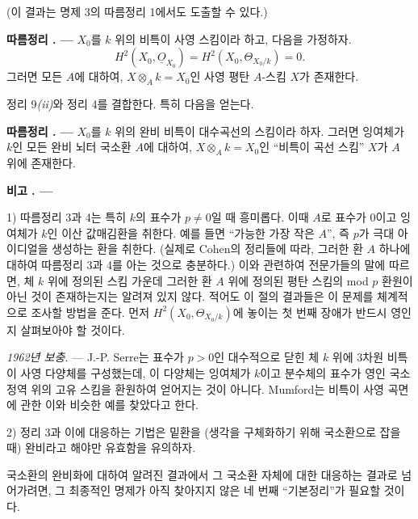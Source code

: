 \documentclass[11pt,twoside,openany]{book}
\numberwithin{equation}{section}
\newcommand{\Osh}{\underline{O}}
\theoremstyle{plain}
\theoremstyle{definition}
\theoremstyle{remark}
\newcommand{\result}[2]{%
  \par\medskip\noindent\textbf{#1%
  \if\relax\detokenize{#2}\relax\else\space#2\fi. ---}\enspace
}
\begin{document}
(이 결과는 명제 3의 따름정리 1에서도 도출할 수 있다.)

\result{따름정리}{3} $X_0$를 $k$ 위의 비특이 사영 스킴이라 하고,
다음을 가정하자.
\[
  H^2(X_0,\Osh_{X_0})=H^2(X_0,\Theta_{X_0/k})=0.
\]
그러면 모든 $A$에 대하여, $X\otimes_A k=X_0$인 사영
평탄 $A$-스킴 $X$가 존재한다.

정리 9\textit{(ii)}와 정리 4를 결합한다. 특히 다음을 얻는다.

\result{따름정리}{4} $X_0$를 $k$ 위의 완비 비특이 대수곡선의
스킴이라 하자. 그러면 잉여체가 $k$인 모든 완비 뇌터 국소환 $A$에 대하여,
$X\otimes_A k=X_0$인 ``비특이 곡선 스킴'' $X$가 $A$ 위에 존재한다.

\result{비고}{}

1) 따름정리 3과 4는 특히 $k$의 표수가
$p\ne0$일 때 흥미롭다. 이때 $A$로 표수가 $0$이고 잉여체가 $k$인
이산 값매김환을 취한다. 예를 들면 ``가능한 가장 작은 $A$'',
즉 $p$가 극대 아이디얼을 생성하는 환을 취한다. (실제로
Cohen의 정리들에 따라, 그러한 환 $A$ 하나에 대하여 따름정리 3과 4를
아는 것으로 충분하다.) 이와 관련하여 전문가들의 말에 따르면,
체 $k$ 위에 정의된 스킴 가운데 그러한 환 $A$ 위에 정의된 평탄 스킴의
mod $p$ 환원이 아닌 것이 존재하는지는 알려져 있지 않다. 적어도 이 절의 결과들은
이 문제를 체계적으로 조사할 방법을 준다. 먼저
$H^2(X_0,\Theta_{X_0/k})$에 놓이는 첫 번째 장애가
반드시 영인지 살펴보아야 할 것이다.

\emph{1962년 보충.} --- J.-P. Serre는 표수가 $p>0$인 대수적으로
닫힌 체 $k$ 위에 3차원 비특이 사영 다양체를 구성했는데, 이 다양체는
잉여체가 $k$이고 분수체의 표수가 영인 국소 정역 위의 고유 스킴을
환원하여 얻어지는 것이 아니다. Mumford는 비특이 사영 곡면에 관한
이와 비슷한 예를 찾았다고 한다.

2) 정리 3과 이에 대응하는 기법은 밑환을 (생각을 구체화하기 위해 국소환으로
잡을 때) 완비라고 해야만 유효함을 유의하자.

국소환의 완비화에 대하여 알려진 결과에서 그 국소환 자체에 대한
대응하는 결과로 넘어가려면, 그 최종적인 명제가 아직 찾아지지 않은
네 번째 ``기본정리''가 필요할 것이다.
\end{document}
